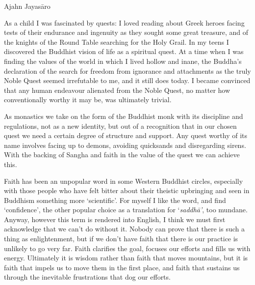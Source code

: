 Ajahn Jayasāro

As a child I was fascinated by quests: I loved reading about Greek
heroes facing tests of their endurance and ingenuity as they sought some
great treasure, and of the knights of the Round Table searching for the
Holy Grail. In my teens I discovered the Buddhist vision of life as a
spiritual quest. At a time when I was finding the values of the world in
which I lived hollow and inane, the Buddha's declaration of the search
for freedom from ignorance and attachments as the truly Noble Quest
seemed irrefutable to me, and it still does today. I became convinced
that any human endeavour alienated from the Noble Quest, no matter how
conventionally worthy it may be, was ultimately trivial.

As monastics we take on the form of the Buddhist monk with its
discipline and regulations, not as a new identity, but out of a
recognition that in our chosen quest we need a certain degree of
structure and support. Any quest worthy of its name involves facing up
to demons, avoiding quicksands and disregarding sirens. With the backing
of Sangha and faith in the value of the quest we can achieve this.

Faith has been an unpopular word in some Western Buddhist circles,
especially with those people who have felt bitter about their theistic
upbringing and seen in Buddhism something more `scientific'. For myself
I like the word, and find `confidence', the other popular choice as a
translation for `\emph{saddhā'}, too mundane. Anyway, however this term
is rendered into English, I think we must first acknowledge that we
can't do without it. Nobody can prove that there is such a thing as
enlightenment, but if we don't have faith that there is our practice is
unlikely to go very far. Faith clarifies the goal, focuses our efforts
and fills us with energy. Ultimately it is wisdom rather than faith that
moves mountains, but it is faith that impels us to move them in the
first place, and faith that sustains us through the inevitable
frustrations that dog our efforts.

